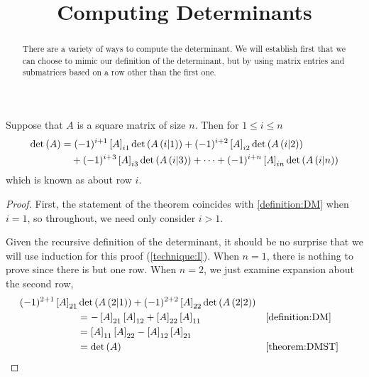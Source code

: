 \documentclass{ximera}
\title{Computing Determinants}
\begin{document}
\begin{abstract}
  There are a variety of ways to compute the determinant.  We will
  establish first that we can choose to mimic our definition of the
  determinant, but by using matrix entries and submatrices based on a
  row other than the first one.
\end{abstract}
\maketitle

\begin{theorem}
\label{theorem:DER}

Suppose that $A$ is a square matrix of size $n$.  Then for $1\leq i\leq n$
\begin{align*}
  \det\left(A\right)&=
               (-1)^{i+1}\left\lbrack A\right\rbrack_{i1}\det\left(A\left(i|1\right)\right)+
               (-1)^{i+2}\left\lbrack A\right\rbrack_{i2}\det\left(A\left(i|2\right)\right)\\
             &\quad+(-1)^{i+3}\left\lbrack A\right\rbrack_{i3}\det\left(A\left(i|3\right)\right)+
               \cdots+
               (-1)^{i+n}\left\lbrack A\right\rbrack_{in}\det\left(A\left(i|n\right)\right)
\end{align*}
which is known as  about row $i$.

\begin{proof}
  First, the statement of the theorem coincides with
  \ref{definition:DM} when $i=1$, so throughout, we need only consider
  $i>1$.

  Given the recursive definition of the determinant, it should be no
  surprise that we will use induction for this proof
  (\ref{technique:I}).  When $n=1$, there is nothing to prove since
  there is but one row.  When $n=2$, we just examine expansion about
  the second row,
  \begin{align*}
(-1)^{2+1}\left\lbrack A\right\rbrack_{21}&\det\left(A\left(2|1\right)\right)+
                               (-1)^{2+2}\left\lbrack A\right\rbrack_{22}\det\left(A\left(2|2\right)\right)\\
                             &=-\left\lbrack A\right\rbrack_{21}\left\lbrack A\right\rbrack_{12}+\left\lbrack A\right\rbrack_{22}\left\lbrack A\right\rbrack_{11}
                             &&\ref{definition:DM}\\
&=\left\lbrack A\right\rbrack_{11}\left\lbrack A\right\rbrack_{22}-\left\lbrack A\right\rbrack_{12}\left\lbrack A\right\rbrack_{21}\\
                             &=
                               \det\left(A\right)&&\ref{theorem:DMST}\\
  \end{align*}
  

\end{proof}
\end{theorem}
\end{document}
